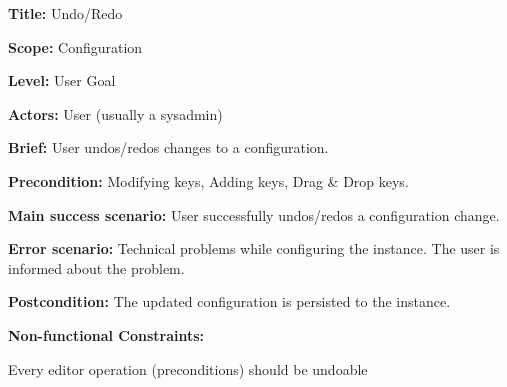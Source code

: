
\begin{DoxyItemize}
\item {\bfseries Title\+:} Undo/\+Redo
\item {\bfseries Scope\+:} Configuration
\item {\bfseries Level\+:} User Goal
\item {\bfseries Actors\+:} User (usually a sysadmin)
\item {\bfseries Brief\+:} User undos/redos changes to a configuration.
\end{DoxyItemize}


\begin{DoxyItemize}
\item {\bfseries Precondition\+:} Modifying keys, Adding keys, Drag \& Drop keys.
\item {\bfseries Main success scenario\+:} User successfully undos/redos a configuration change.
\item {\bfseries Error scenario\+:} Technical problems while configuring the instance. The user is informed about the problem.
\item {\bfseries Postcondition\+:} The updated configuration is persisted to the instance.
\item {\bfseries Non-\/functional Constraints\+:}
\begin{DoxyItemize}
\item Every editor operation (preconditions) should be undoable 
\end{DoxyItemize}
\end{DoxyItemize}
